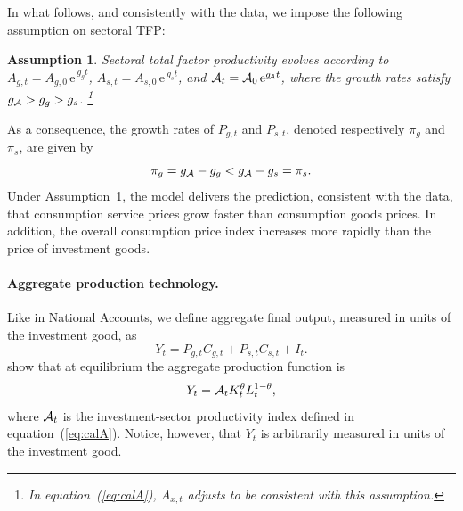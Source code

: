 \documentclass[12pt,a4paper]{article}
\newtheorem{assumption}{Assumption}
\begin{document}
In what follows, and consistently with the data, we impose the following assumption on sectoral TFP:

\begin{assumption}\label{ass:TFPs}
Sectoral total factor productivity evolves according to \( A_{g,t} = A_{g,0}\, \text{e}^{\ g_g t} \), \( A_{s,t} = A_{s,0}\, \text{e}^{\ g_s t} \), and \( {\cal A}_{t} = {\cal A}_{0}\, \text{e}^{g_{\hspace{-.05cm}\cal A} t} \), where the growth rates satisfy \( g_{\cal A} > g_g > g_s \).%
\footnote{In equation~(\ref{eq:calA}), \( A_{x,t} \) adjusts to be consistent with this assumption.}
\end{assumption}
As a consequence, the growth rates of \( P_{g,t} \) and \( P_{s,t} \), denoted respectively \( \pi_g \) and \( \pi_s \), are given by
\[
\pi_g = g_{\cal A} - g_g  < g_{\cal A} - g_s = \pi_s.
\]
Under Assumption~\ref{ass:TFPs}, the model delivers the prediction, consistent with the data, that consumption service prices grow faster than consumption goods prices. In addition, the overall consumption price index increases more rapidly than the price of investment goods.

\paragraph{Aggregate production technology.}

Like in National Accounts, we define aggregate final output, measured in units of the investment good, as
\begin{equation}\label{eq:identity}
Y_t = P_{g,t} C_{g,t} + P_{s,t} C_{s,t} + I_t.
\end{equation}
\cite{herrendorf_rogerson_valentinyi_2021} show that at equilibrium the aggregate production function is
\begin{equation}\label{eq:output}
Y_t = {\cal A}_t K_t^{\theta} L_t^{1 - \theta},
\end{equation}
where \( {\cal A}_t \) is the investment-sector productivity index defined in equation~(\ref{eq:calA}). Notice, however, that $Y_t$ is arbitrarily measured in units of the investment good.


\end{document}
